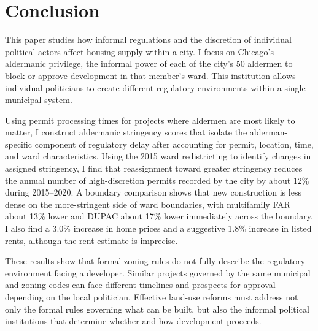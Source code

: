 
\section{Conclusion}
\label{sec:conclusion}

This paper studies how informal regulations and the discretion of individual political actors affect housing supply within a city.
I focus on Chicago's aldermanic privilege, the informal power of each of the city's 50 aldermen to block or approve development in that member's ward.
This institution allows individual politicians to create different regulatory environments within a single municipal system.

Using permit processing times for projects where aldermen are most likely to matter, I construct aldermanic stringency scores that isolate the alderman-specific component of regulatory delay after accounting for permit, location, time, and ward characteristics.
Using the 2015 ward redistricting to identify changes in assigned stringency, I find that reassignment toward greater stringency reduces the annual number of high-discretion permits recorded by the city by about 12\% during 2015--2020.
A boundary comparison shows that new construction is less dense on the more-stringent side of ward boundaries, with multifamily FAR about 13\% lower and DUPAC about 17\% lower immediately across the boundary.
I also find a 3.0\% increase in home prices and a suggestive 1.8\% increase in listed rents, although the rent estimate is imprecise.

These results show that formal zoning rules do not fully describe the regulatory environment facing a developer.
Similar projects governed by the same municipal and zoning codes can face different timelines and prospects for approval depending on the local politician.
Effective land-use reforms must address not only the formal rules governing what can be built, but also the informal political institutions that determine whether and how development proceeds.
